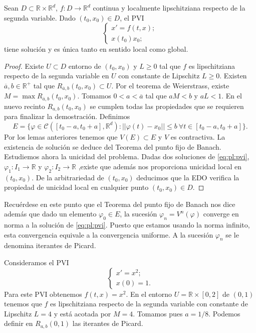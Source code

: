 \documentclass{article}
\begin{document}
\begin{thm}
  Sean $D \subset \mathbb{R} \times \mathbb{R}^d$, $f: D \to \mathbb{R}^d$ continua y localmente
  lipschitziana respecto de la segunda variable. Dado $(t_0, x_0) \in D$, el PVI
  \begin{equation}
    \label{eq:pl:pvi}
    \begin{cases}
      x' = f(t,x); \\ x(t_0) x_0;
    \end{cases}
  \end{equation}
  tiene solución y es única tanto en sentido local como global.
\end{thm}
\begin{proof}
  Existe $U \subset D$ entorno de $(t_0, x_0)$ y $L \ge 0$ tal que $f$ es lipschitziana respecto de
  la segunda variable en $U$ con constante de Lipschitz $L \ge 0$. Existen
  $\overline{a}, b \in \mathbb{R}^+$ tal que $R_{\overline{a},b}(t_0, x_0) \subset U$. Por el
  teorema de Weierstrass, existe $M = \max R_{\overline{a},b}(t_0, x_0)$. Tomamos
  $0 < a < \overline{a}$ tal que $a M < b$ y $a L < 1$. En el nuevo recinto $R_{a,b}(t_0, x_0)$ se
  cumplen todas las propiedades que se requieren para finalizar la demostración. Definimos
  \[E = \{\varphi \in \mathcal{C}([t_0-a, t_0+a], \mathbb{R}^d): ||\varphi(t)-x_0|| \le b \ \forall
    t \in [t_0-a, t_0+a]\}.\] Por los lemas anteriores tenemos que $V(E) \subset E$ y $V$ es
  contractiva. La existencia de solución se deduce del Teorema del punto fijo de Banach. Estudiemos
  ahora la unicidad del problema. Dadas dos soluciones de \eqref{eq:pl:pvi},
  $\varphi_1: I_1 \to \mathbb{R}$ y $\varphi_2: I_2 \to \mathbb{R}$ ,existe que además nos
  proporciona unicidad local en $(t_0, x_0)$.  De la arbitrariedad de $(t_0, x_0)$ deducimos que la
  EDO verifica la propiedad de unicidad local en cualquier punto $(t_0, x_0) \in D$.
\end{proof}

Recuérdese en este punto que el Teorema del punto fijo de Banach nos dice además que dado un
elemento $\varphi_0 \in E$, la sucesión $\varphi_n = V^n(\varphi)$ converge en norma a la solución
de \ref{eq:pl:pvi}. Puesto que estamos usando la norma infinito, esta convergencia equivale a la
convergencia uniforme. A la sucesión $\varphi_n$ se le denomina iterantes de Picard.

\begin{ex}
  Consideramos el PVI
  \begin{equation}
    \begin{cases}
      x' = x^2; \\ x(0) = 1.
    \end{cases}
  \end{equation}
  Para este PVI obtenemos $f(t,x) = x^2$. En el entorno $U = \mathbb{R} \times [0,2]$ de $(0,1)$
  tenemos que $f$ es lipschitziana respecto de la segunda variable con constante de Lipschitz
  $L = 4$ y está acotada por $M = 4$. Tomamos pues $a = 1/8$. Podemos definir en $R_{a,b}(0,1)$ las
  iterantes de Picard.
\end{ex}
\end{document}
